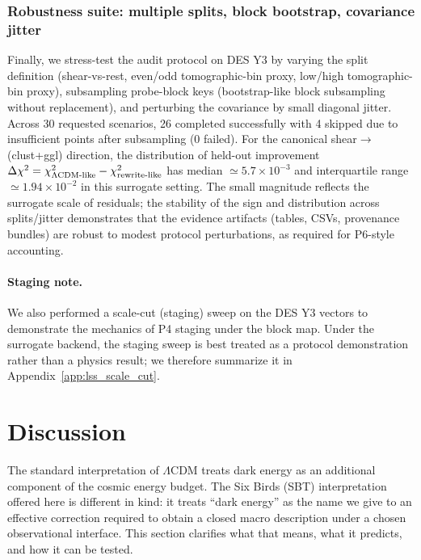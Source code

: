 \documentclass[11pt]{article}
\theoremstyle{definition}
\theoremstyle{plain}
\theoremstyle{remark}
\begin{document}
\subsubsection{Robustness suite: multiple splits, block bootstrap, covariance jitter}\label{sec:results:lss_robustness}
Finally, we stress-test the audit protocol on DES Y3 by varying the split definition (shear-vs-rest, even/odd tomographic-bin proxy, low/high tomographic-bin proxy), subsampling probe-block keys (bootstrap-like block subsampling without replacement), and perturbing the covariance by small diagonal jitter.
Across 30 requested scenarios, 26 completed successfully with 4 skipped due to insufficient points after subsampling (0 failed).
For the canonical shear$\to$(clust+ggl) direction, the distribution of held-out improvement $\Delta\chi^2=\chi^2_{\Lambda{\rm CDM\text{-}like}}-\chi^2_{\rm rewrite\text{-}like}$ has median $\simeq 5.7\times 10^{-3}$ and interquartile range $\simeq 1.94\times 10^{-2}$ in this surrogate setting.
The small magnitude reflects the surrogate scale of residuals; the stability of the sign and distribution across splits/jitter demonstrates that the evidence artifacts (tables, CSVs, provenance bundles) are robust to modest protocol perturbations, as required for P6-style accounting.

\paragraph{Staging note.}
We also performed a scale-cut (staging) sweep on the DES Y3 vectors to demonstrate the mechanics of P4 staging under the block map.
Under the surrogate backend, the staging sweep is best treated as a protocol demonstration rather than a physics result; we therefore summarize it in Appendix~\ref{app:lss_scale_cut}.

\section{Discussion}\label{sec:discussion}
The standard interpretation of $\Lambda$CDM treats dark energy as an additional component of the cosmic energy budget. The Six Birds (SBT) interpretation offered here is different in kind: it treats ``dark energy'' as the name we give to an effective correction required to obtain a closed macro description under a chosen observational interface. This section clarifies what that means, what it predicts, and how it can be tested.
\end{document}

